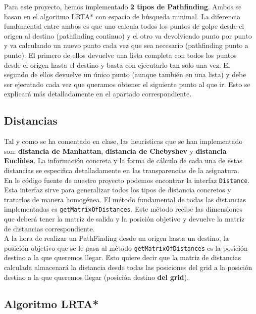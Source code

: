 Para este proyecto, hemos implementado \textbf{2 tipos de Pathfinding}. Ambos se basan en el algoritmo LRTA* con espacio de búsqueda minimal. La diferencia fundamental entre ambos es que uno calcula todos los puntos de golpe desde el origen al destino (pathfinding continuo) y el otro va devolviendo punto por punto y va calculando un nuevo punto cada vez que sea necesario (pathfinding punto a punto). El primero de ellos devuelve una lista completa con todos los puntos desde el origen hasta el destino y basta con ejecutarlo tan solo una vez. El segundo de ellos devuelve un único punto (aunque también en una lista) y debe ser ejecutado cada vez que queramos obtener el siguiente punto al que ir. Esto se explicará más detalladamente en el apartado correspondiente.

\subsection{Distancias}

Tal y como se ha comentado en clase, las heurísticas que se han implementado son: \textbf{distancia de Manhattan}, \textbf{distancia de Chebyshev} y \textbf{distancia Euclídea}. La información concreta y la forma de cálculo de cada una de estas distancias se especifica detalladamente en las transparencias de la asignatura. \\

En le código fuente de nuestro proyecto podemos encontrar la interfaz \texttt{Distance}. Esta interfaz sirve para generalizar todos los tipos de distancia concretos y tratarlos de manera homogénea. El método fundamental de todas las distancias implementadas es \texttt{getMatrixOfDistances}. Este método recibe las dimensiones que deberá tener la matriz de salida y la posición objetivo y devuelve la matriz de distancias correspondiente. \\

A la hora de realizar un PathFinding desde un origen hasta un destino, la posición objetivo que se le pasa al método \texttt{getMatrixOfDistances} es la posición destino a la que queremos llegar. Esto quiere decir que la matriz de distancias calculada almacenará la distancia desde todas las posiciones del grid a la posición destino a la que queremos llegar (posición destino \textbf{del grid}).

\subsection{Algoritmo LRTA*}


